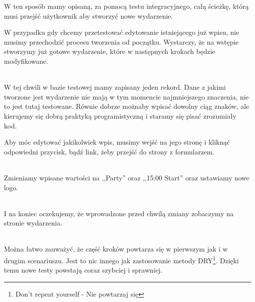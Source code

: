 W ten sposób mamy opisaną, za pomocą testu integracyjnego, całą ścieżkę, którą musi przejść użytkownik aby stworzyć nowe wydarzenie.

W przypadku gdy chcemy przetestować edytowanie istniejącego już wpisu, nie musimy przechodzić procesu tworzenia od początku. Wystarczy, że na wstępie stworzymy już gotowe wydarzenie, które w następnych krokach będzie modyfikowane.

\begin{code}
	
\end{code}\\

W tej chwili w bazie testowej mamy zapisany jeden rekord. Dane z jakimi tworzone jest wydarzenie nie mają w tym momencie najmniejszego znaczenia, nie to jest tutaj testowane. Równie dobrze możnaby wpisać dowolny ciąg znaków, ale kierujemy się dobrą praktyką programistyczną i staramy się pisać zrozumiały kod.

Aby móc edytować jakikolwiek wpis, musimy wejść na jego stronę i kliknąć odpowiedni przycisk, bądź link, żeby przejść do strony z formularzem.

\begin{code}
	
\end{code}\\

Zmieniamy wpisane wartości na ,,Party'' oraz ,,15:00 Start'' oraz ustawiamy nowe logo.

\begin{code}
	
\end{code}\\

I na koniec oczekujemy, że wprowadzone przed chwilą zmiany zobaczymy na stronie wydarzenia.

\begin{code}
	
\end{code}\\

Można łatwo zauważyć, że część kroków powtarza się w pierwszym jak i w drugim scenariuszu. Jest to nic innego jak zastosowanie metody DRY\footnote{Don't repeat yourself - Nie powtarzaj się}. Dzięki temu nowe testy powstają coraz szybciej i sprawniej.

